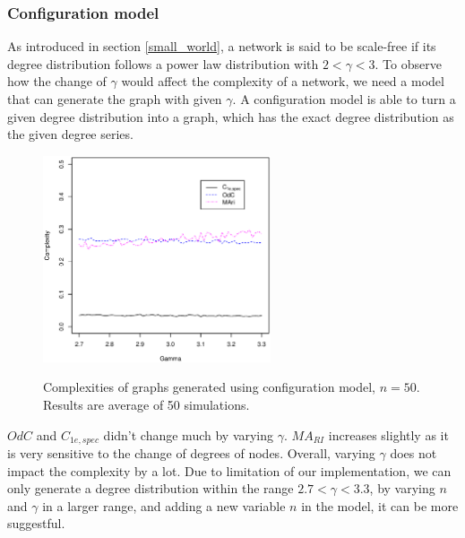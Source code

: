 \documentclass[12pt]{article}
\begin{document}
\subsubsection{Configuration model}
\label{configuration_model}
As introduced in section \ref{small_world}, a network is said to be scale-free if its degree distribution follows a power law distribution with $2<\gamma <3$. To observe how the change of $\gamma$ would affect the complexity of a network, we need a model that can generate the graph with given $\gamma$. A configuration model \cite{newmanbook} is able to turn a given degree distribution into a graph, which has the exact degree distribution as the given degree series. 
\begin{figure}[h]
    \centering
    \includegraphics[width=0.6\textwidth]{configuration_model.eps}
    \label{fig:configuration_model}
    \caption{Complexities of graphs generated using configuration model, $n=50$. Results are average of 50 simulations.}
\end{figure}
\par
$OdC$ and $C_{1e,spec}$ didn't change much by varying $\gamma$. $MA_{RI}$ increases slightly as it is very sensitive to the change of degrees of nodes. Overall, varying $\gamma$ does not impact the complexity by a lot. Due to limitation of our implementation, we can only generate a degree distribution within the range $2.7<\gamma<3.3$, by varying $n$ and $\gamma$ in a larger range, and adding a new variable $n$ in the model, it can be more suggestful. 
\end{document}
